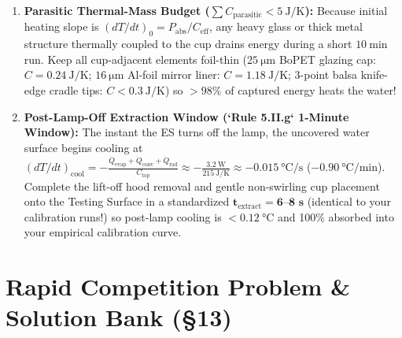 \begin{devicebox}
\begin{enumerate}
  \item \textbf{Parasitic Thermal-Mass Budget ($\sum C_{\mathrm{parasitic}} < \SI{5}{\joule\per\kelvin}$):} Because initial heating slope is $(dT/dt)_0 = P_{\mathrm{abs}}/C_{\mathrm{eff}}$, any heavy glass or thick metal structure thermally coupled to the cup drains energy during a short $\SI{10}{\minute}$ run. Keep all cup-adjacent elements foil-thin ($\SI{25}{\micro\meter}$ BoPET glazing cap: $C = \SI{0.24}{\joule\per\kelvin}$; $\SI{16}{\micro\meter}$ Al-foil mirror liner: $C = \SI{1.18}{\joule\per\kelvin}$; 3-point balsa knife-edge cradle tips: $C < \SI{0.3}{\joule\per\kelvin}$) so $>98\%$ of captured energy heats the water!
  \item \textbf{Post-Lamp-Off Extraction Window (`Rule 5.II.g` 1-Minute Window):} The instant the ES turns off the lamp, the uncovered water surface begins cooling at $(dT/dt)_{\mathrm{cool}} = -\frac{\dot{Q}_{\mathrm{evap}} + \dot{Q}_{\mathrm{conv}} + \dot{Q}_{\mathrm{rad}}}{C_{\mathrm{top}}} \approx -\frac{\SI{3.2}{\watt}}{\SI{215}{\joule\per\kelvin}} \approx -\SI{0.015}{\celsius\per\second}$ ($-\SI{0.90}{\celsius\per\minute}$). Complete the lift-off hood removal and gentle non-swirling cup placement onto the Testing Surface in a standardized $\mathbf{t_{\mathrm{extract}} = 6\text{--}8\text{ s}}$ (identical to your calibration runs!) so post-lamp cooling is $< \SI{0.12}{\celsius}$ and 100\% absorbed into your empirical calibration curve.
\end{enumerate}
\end{devicebox}

\section{Rapid Competition Problem \& Solution Bank (§13)}
\label{sec:13.6}

